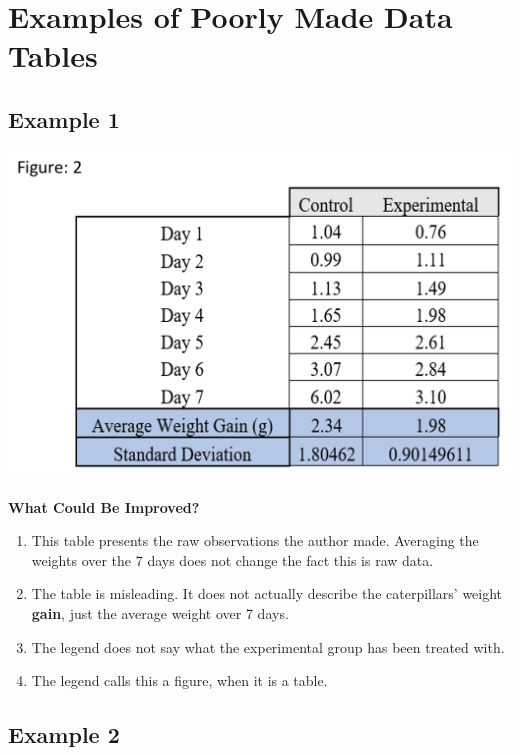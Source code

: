\documentclass[
]{book}
\providecommand{\tightlist}{%
  \setlength{\itemsep}{0pt}\setlength{\parskip}{0pt}}
\begin{document}
\hypertarget{examples-of-poorly-made-data-tables}{%
\section{Examples of Poorly Made Data Tables}\label{examples-of-poorly-made-data-tables}}

\hypertarget{example-1-14}{%
\subsection{Example 1}\label{example-1-14}}

\includegraphics{images/Raw_data1.png}

\textbf{What Could Be Improved?}

\begin{enumerate}
\def\labelenumi{\arabic{enumi}.}
\tightlist
\item
  This table presents the raw observations the author made. Averaging the weights over the 7 days does not change the fact this is raw data.
\item
  The table is misleading. It does not actually describe the caterpillars' weight \textbf{gain}, just the average weight over 7 days.
\item
  The legend does not say what the experimental group has been treated with.
\item
  The legend calls this a figure, when it is a table.
\end{enumerate}

\hypertarget{example-2-14}{%
\subsection{Example 2}\label{example-2-14}}
\end{document}
